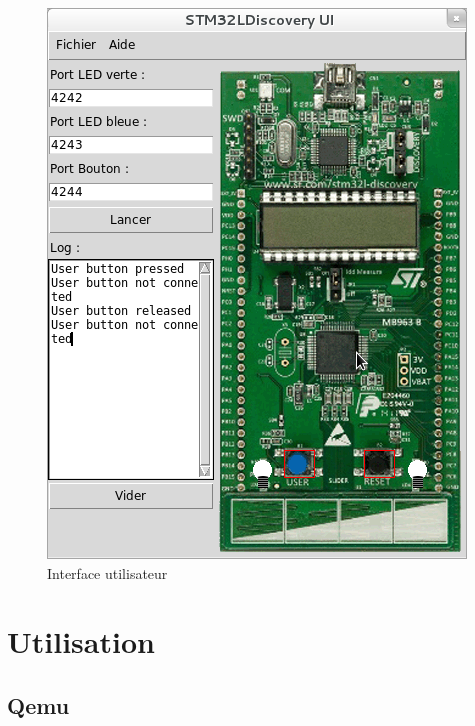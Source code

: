 \documentclass{article}
\begin{document}
		\begin{figure}[h]
		  \centering
		  \includegraphics[scale=0.6]{img/UICapture.png}
		  \caption{Interface utilisateur}
		\end{figure}

\section{Utilisation}	
	\subsection{Qemu}
\end{document}
